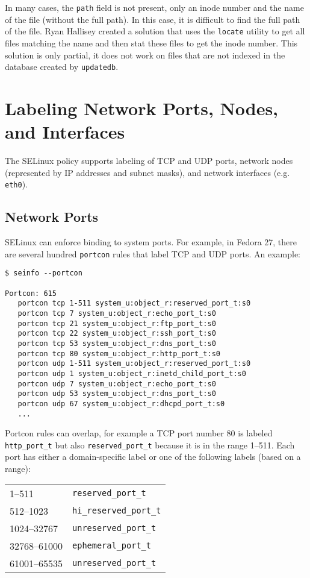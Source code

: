 In many cases, the \texttt{path} field is not present, only an inode number and
the name of the file (without the full path). In this case, it is difficult to
find the full path of the file. Ryan Hallisey created a solution
\cite{restoreconpullreq} that uses the \texttt{locate} utility to get all files
matching the name and then stat these files to get the inode number. This
solution is only partial, it does not work on files that are not indexed in the
database created by \texttt{updatedb}.

\section{Labeling Network Ports, Nodes, and Interfaces}
\label{networkobjects}
The SELinux policy supports labeling of TCP and UDP ports, network nodes
(represented by IP addresses and subnet masks), and network interfaces (e.g.
\texttt{eth0}).

\subsection{Network Ports}
SELinux can enforce binding to system ports. For example, in Fedora 27, there
are several hundred \texttt{portcon} rules that label TCP and UDP ports.
An example:
\begin{lstlisting}
$ seinfo --portcon

Portcon: 615
   portcon tcp 1-511 system_u:object_r:reserved_port_t:s0
   portcon tcp 7 system_u:object_r:echo_port_t:s0
   portcon tcp 21 system_u:object_r:ftp_port_t:s0
   portcon tcp 22 system_u:object_r:ssh_port_t:s0
   portcon tcp 53 system_u:object_r:dns_port_t:s0
   portcon tcp 80 system_u:object_r:http_port_t:s0
   portcon udp 1-511 system_u:object_r:reserved_port_t:s0
   portcon udp 1 system_u:object_r:inetd_child_port_t:s0
   portcon udp 7 system_u:object_r:echo_port_t:s0
   portcon udp 53 system_u:object_r:dns_port_t:s0
   portcon udp 67 system_u:object_r:dhcpd_port_t:s0
   ...
\end{lstlisting}
Portcon rules can overlap, for example a TCP port number 80 is labeled
\texttt{http\_port\_t} but also \texttt{reserved\_port\_t} because it is in the
range 1--511. Each port has either a domain-specific label or one of the
following labels (based on a range):

\begin{tabular}{l l}
    1--511 & \texttt{reserved\_port\_t} \\
    512--1023 & \texttt{hi\_reserved\_port\_t} \\
    1024--32767 & \texttt{unreserved\_port\_t} \\
    32768--61000 & \texttt{ephemeral\_port\_t} \\
    61001--65535 & \texttt{unreserved\_port\_t} \\
\end{tabular}

